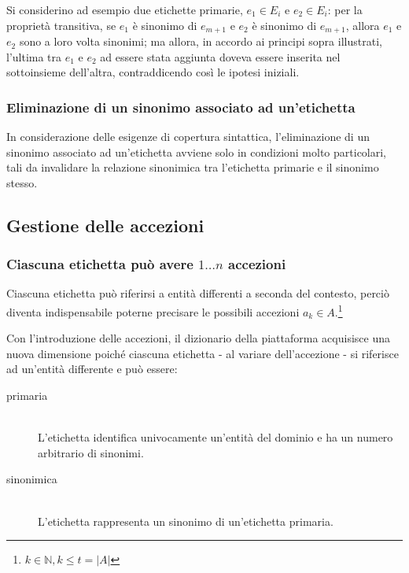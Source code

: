\documentclass[10pt,a4paper,headinclude,footinclude,hidelinks]{scrreprt} %
\begin{document}
	Si considerino ad esempio due etichette primarie, $e_1 \in E_i$ e $e_2 \in E_i$: per la proprietà transitiva, se $e_1$ è sinonimo di $e_{m+1}$ e $e_2$ è sinonimo di $e_{m+1}$, allora $e_1$ e $e_2$ sono a loro volta sinonimi; ma allora, in accordo ai principi sopra illustrati, l'ultima tra $e_1$ e $e_2$ ad essere stata aggiunta doveva essere inserita nel sottoinsieme dell'altra, contraddicendo così le ipotesi iniziali.

	\subsubsection{Eliminazione di un sinonimo associato ad un'etichetta}
	In considerazione delle esigenze di copertura sintattica, l'eliminazione di un sinonimo associato ad un'etichetta avviene solo in condizioni molto particolari, tali da invalidare la relazione sinonimica tra l'etichetta primarie e il sinonimo stesso.

	\subsection{Gestione delle accezioni}
	\label{sec:stage:req:etichette:accezioni}
	\subsubsection{Ciascuna etichetta può avere $1\ldots n$ accezioni}
	Ciascuna etichetta può riferirsi a entità differenti a seconda del contesto, perciò diventa indispensabile poterne precisare le possibili accezioni $a_k \in A$.\footnote{$k \in \mathbb{N}, k \leq t=\left|A\right|$}
	
	Con l'introduzione delle accezioni, il dizionario della piattaforma acquisisce una nuova dimensione poiché ciascuna etichetta - al variare dell'accezione - si riferisce ad un'entità differente e può essere:
	\begin{description}
	\item[primaria] \hfill \\
	L'etichetta identifica univocamente un'entità del dominio e ha un numero arbitrario di sinonimi.
	\item[sinonimica] \hfill \\
	L'etichetta rappresenta un sinonimo di un'etichetta primaria.
	\end{description}
\end{document}
